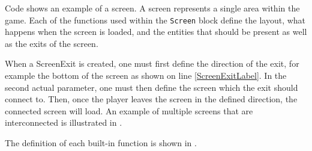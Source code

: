 Code  shows an example of a screen. A screen represents a single area within the game. Each of the functions used within the \texttt{Screen} block define the layout, what happens when the screen is loaded, and the entities that should be present as well as the exits of the screen.

When a ScreenExit is created, one must first define the direction of the exit, for example the bottom of the screen as shown on line \ref{ScreenExitLabel}.
In the second actual parameter, one must then define the screen which the exit should connect to.
Then, once the player leaves the screen in the defined direction, the connected screen will load. An example of multiple screens that are interconnected is illustrated in .


The definition of each built-in function is shown in .











